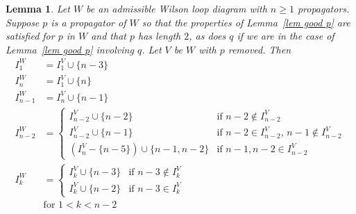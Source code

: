 \documentclass[11pt]{article}
\newtheorem{lem}[thm]{Lemma}
\theoremstyle{remark}
\theoremstyle{definition}
\begin{document}

\begin{lem}\label{lem I}
  Let $W$ be an admissible Wilson loop diagram with $n\geq 1$ propagators.  Suppose $p$ is a propagator of $W$ so that the properties of Lemma~\ref{lem good p} are satisfied for $p$ in $W$ and that $p$ has length $2$, as does $q$ if we are in the case of Lemma~\ref{lem good p} involving $q$.  Let $V$ be $W$ with $p$ removed.  Then
  \begin{align*}
    I_1^{W} & = I_1^{V} \cup \{n-3\} \\
    I_n^{W} & = I_1^{V} \cup \{n\} \\
    I_{n-1}^{W} & = I_n^{V} \cup \{n-1\} \\
    I_{n-2}^{W} & =
    \begin{cases}
      I_{n-2}^{V}\cup \{n-2\} & \text{if $n-2\not\in I_{n-2}^{V}$} \\
      I_{n-2}^{V}\cup \{n-1\} & \text{if $n-2\in I_{n-2}^{V}$, $n-1\not\in I_{n-2}^{V}$} \\
      (I_{n}^{V} - \{n-5\})\cup \{n-1,n-2\} & \text{if $n-1, n-2\in I_{n-2}^{V}$}
    \end{cases} \\
    I_{k}^{W} & =
    \begin{cases}
      I_k^{V}\cup \{n-3\} & \text{if $n-3 \not\in I_k^{V}$}\\
      I_k^{V}\cup\{n-2\} & \text{if $n-3\in I_k^{V}$}
    \end{cases} \\
    & \text{for $1<k<n-2$}
  \end{align*}
\end{lem}
\end{document}
